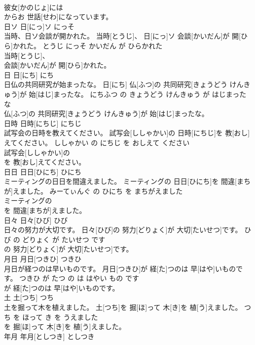 \documentclass[8pt]{extreport}
\begin{document}
\begin{CJK}{UTF8}{min}
\\	彼女[かのじょ]には
\\	からお 世話[せわ]になっています。			
\\	日ソ	日[にっ]ソ	にっそ	
\\	当時、日ソ会談が開かれた。	当時[とうじ]、 日[にっ]ソ 会談[かいだん]が 開[ひら]かれた。	とうじ にっそ かいだん が ひらかれた	
\\	当時[とうじ]、
\\	会談[かいだん]が 開[ひら]かれた。			
\\	日	日[にち]	にち	
\\	日仏の共同研究が始まったな。	日[にち] 仏[ふつ]の 共同研究[きょうどう けんきゅう]が 始[はじ]まったな。	にちふつ の きょうどう けんきゅう が はじまった な	
\\	仏[ふつ]の 共同研究[きょうどう けんきゅう]が 始[はじ]まったな。			
\\	日時	日時[にちじ]	にちじ	
\\	試写会の日時を教えてください。	試写会[ししゃかい]の 日時[にちじ]を 教[おし]えてください。	ししゃかい の にちじ を おしえて ください	
\\	試写会[ししゃかい]の
\\	を 教[おし]えてください。			
\\	日日	日日[ひにち]	ひにち	
\\	ミーティングの日日を間違えました。	ミーティングの 日日[ひにち]を 間違[まちが]えました。	みーてぃんぐ の ひにち を まちがえました	
\\	ミーティングの
\\	を 間違[まちが]えました。			
\\	日々	日々[ひび]	ひび	
\\	日々の努力が大切です。	日々[ひび]の 努力[どりょく]が 大切[たいせつ]です。	ひび の どりょく が たいせつ です	
\\	の 努力[どりょく]が 大切[たいせつ]です。			
\\	月日	月日[つきひ]	つきひ	
\\	月日が経つのは早いものです。	月日[つきひ]が 経[た]つのは 早[はや]いものです。	つきひ が たつ の は はやい もの です	
\\	が 経[た]つのは 早[はや]いものです。			
\\	土	土[つち]	つち	
\\	土を掘って木を植えました。	土[つち]を 掘[ほ]って 木[き]を 植[う]えました。	つち を ほって き を うえました	
\\	を 掘[ほ]って 木[き]を 植[う]えました。			
\\	年月	年月[としつき]	としつき	

\end{CJK}
\end{document}
